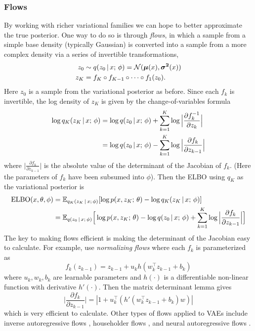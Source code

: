 \documentclass{article}
\begin{document}
\subsubsection{Flows}\label{vaeflows}
By working with richer variational families we can hope to better approximate the true posterior.
One way to do so is through \emph{flows}, in which a sample from a simple base density (typically Gaussian) is converted into a sample from a more complex density via a series of invertible transformations, \begin{align*}
z_0 &\sim q(z_0 \,|\, x ; \, \phi) = \mathcal{N}(\boldsymbol{\mu}(x), \boldsymbol{\sigma^2}(x))\\
z_K &= f_K \circ f_{K-1} \circ \dots \circ f_1(z_0).
\end{align*}
Here $z_0$ is a sample from the variational posterior as before.
Since each $f_k$ is invertible, the log density of $z_K$ is given by the change-of-variables formula
\begin{align*}
\log q_K(z_K \,|\, x ; \, \phi) &= \log q(z_0 \,|\, x ; \, \phi) + 
\sum_{k=1}^K \log \Big | \frac{\partial f_k^{-1}}{\partial z_{k}}\Big |  \\
&=\log q(z_0 \,|\, x ; \, \phi) - 
\sum_{k=1}^K \log \Big | \frac{\partial f_k}{\partial z_{k-1}}\Big | 
\end{align*}
where $ | \frac{\partial f_k}{\partial z_{k-1}}\Big | $ is the absolute value of the determinant 
of the Jacobian of $f_k$. (Here the parameters of $f_k$ have been subsumed into $\phi$).
Then the ELBO using $q_K$ as the variational posterior is
\begin{align*}
\operatorname*{ELBO}(x, \theta, \phi) &= \mathbb{E}_{q_K(z_K \,|\, x ; \, \phi)} [\log p(x, z_K ; \, \theta) - \log q_K(z_K \,|\, x ; \, \phi)] \\
&= \mathbb{E}_{q(z_0 \,|\, x ; \, \phi)} \Big[\log p(x, z_K ; \, \theta) - \log q(z_0 \,|\, x ; \, \phi) + 
\sum_{k=1}^K \log \Big | \frac{\partial f_k}{\partial z_{k-1}}\Big| \Big]\\
\end{align*}
The key to making flows efficient is making the determinant of the Jacobian easy to calculate.
For example, \cite{Rezende2015} use \emph{normalizing flows} where each $f_k$ is parameterized as
\[f_k(z_{k-1}) =  z_{k-1} + u_k h(w_k^\top z_{k-1} + b_k)\]
where $u_k, w_k, b_k$ are learnable parameters and $h(\cdot)$ is a differentiable non-linear function with
derivative $h'(\cdot)$. Then the matrix determinant lemma gives 
\[ \Big| \frac{\partial f_k}{\partial z_{k-1}}\Big| = |1 + u_k^\top (h'(w_k^\top z_{k-1} + b_k) w)| \]
which is very efficient to calculate. Other types of flows applied to VAEs include
inverse autoregressive flows \citep{Kingma2015}, householder flows \citep{Tomczak2016hf,berg2018}, and neural autoregressive flows \citep{huang2018naf}.
\end{document}

